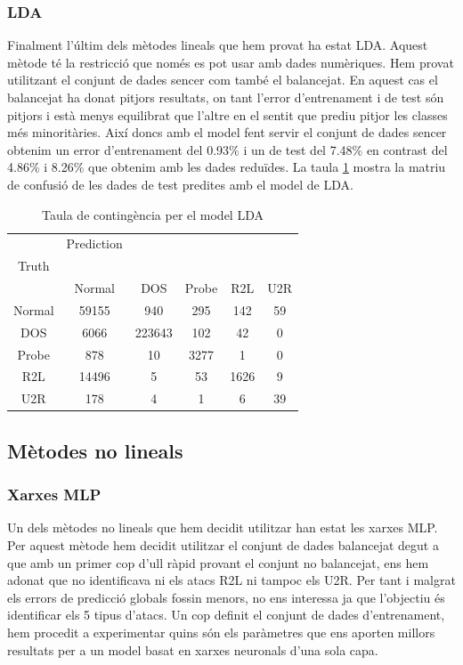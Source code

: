 \documentclass[a4paper]{article} %
\begin{document}
\subsubsection{LDA}
Finalment l'últim dels mètodes lineals que hem provat ha estat LDA. Aquest mètode té la restricció que només es pot usar amb dades numèriques. Hem provat utilitzant el conjunt de dades sencer com també el balancejat. En aquest cas el balancejat ha donat pitjors resultats, on tant l'error d'entrenament i de test són pitjors i està menys equilibrat que l'altre en el sentit que prediu pitjor les classes més minoritàries. Així doncs amb el model fent servir el conjunt de dades sencer obtenim un error d'entrenament del 0.93\% i un de test del 7.48\% en contrast del  4.86\% i 8.26\% que obtenim amb les dades reduïdes. La taula \ref{table:lda_table} mostra la matriu de confusió de les dades de test predites amb el model de LDA.

\begin{table}[H]
	\centering
	\begin{tabular}{c | c c c c c}
			& Prediction\\
		Truth\\
				& Normal & DOS & Probe & R2L & U2R \\
		\hline
		Normal	& 59155	& 940 	 & 295	 & 142 	& 59 \\
		DOS		& 6066	& 223643 & 102	 & 42  	& 0\\
		Probe	& 878	& 10	 & 3277	 & 1	&  0 \\
		R2L		& 14496	& 5		 & 53   & 1626 & 9\\
		U2R		& 178	& 4		 & 1    &  6 	& 39\\	
	\end{tabular}
	\caption{Taula de contingència per el model LDA}
	\label{table:lda_table}
\end{table}


   
\subsection{Mètodes no lineals}

\subsubsection{Xarxes MLP}

Un dels mètodes no lineals que hem decidit utilitzar han estat les xarxes MLP. Per aquest mètode hem decidit utilitzar el conjunt de dades balancejat degut a que amb un primer cop d'ull ràpid provant el conjunt no balancejat, ens hem adonat que no identificava ni els atacs R2L ni tampoc els U2R. Per tant i malgrat els errors de predicció globals fossin menors, no ens interessa ja que l'objectiu és identificar els 5 tipus d'atacs.
Un cop definit el conjunt de dades d'entrenament, hem procedit a experimentar quins són els paràmetres que ens aporten millors resultats per a un model basat en xarxes neuronals d'una sola capa.
\end{document}
